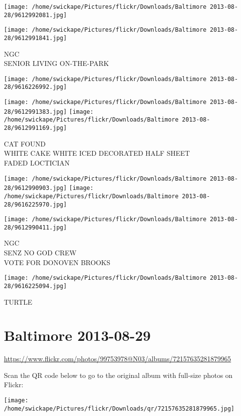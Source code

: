 \documentclass[10pt,letterpaper]{article}
\begin{document}
\texttt{[image: /home/swickape/Pictures/flickr/Downloads/Baltimore 2013-08-28/9612992081.jpg]}

\vspace{0.25in}
\texttt{[image: /home/swickape/Pictures/flickr/Downloads/Baltimore 2013-08-28/9612991841.jpg]}

NGC\\
SENIOR LIVING ON{-}THE{-}PARK
\pagebreak

\texttt{[image: /home/swickape/Pictures/flickr/Downloads/Baltimore 2013-08-28/9616226992.jpg]}

\vspace{0.25in}
\texttt{[image: /home/swickape/Pictures/flickr/Downloads/Baltimore 2013-08-28/9612991383.jpg]}
\texttt{[image: /home/swickape/Pictures/flickr/Downloads/Baltimore 2013-08-28/9612991169.jpg]}

CAT FOUND\\
WHITE CAKE WHITE ICED DECORATED HALF SHEET\\
FADED LOCTICIAN
\pagebreak

\texttt{[image: /home/swickape/Pictures/flickr/Downloads/Baltimore 2013-08-28/9612990903.jpg]}
\texttt{[image: /home/swickape/Pictures/flickr/Downloads/Baltimore 2013-08-28/9616225970.jpg]}

\vspace{0.25in}
\texttt{[image: /home/swickape/Pictures/flickr/Downloads/Baltimore 2013-08-28/9612990411.jpg]}

NGC\\
SENZ NO GOD CREW\\
VOTE FOR DONOVEN BROOKS
\pagebreak

\texttt{[image: /home/swickape/Pictures/flickr/Downloads/Baltimore 2013-08-28/9616225094.jpg]}

TURTLE
\pagebreak

\section*{Baltimore 2013-08-29}

\url{https://www.flickr.com/photos/99753978@N03/albums/72157635281879965}

Scan the QR code below to go to the original album with full-size photos on Flickr:

\texttt{[image: /home/swickape/Pictures/flickr/Downloads/qr/72157635281879965.jpg]}
\pagebreak
\end{document}
